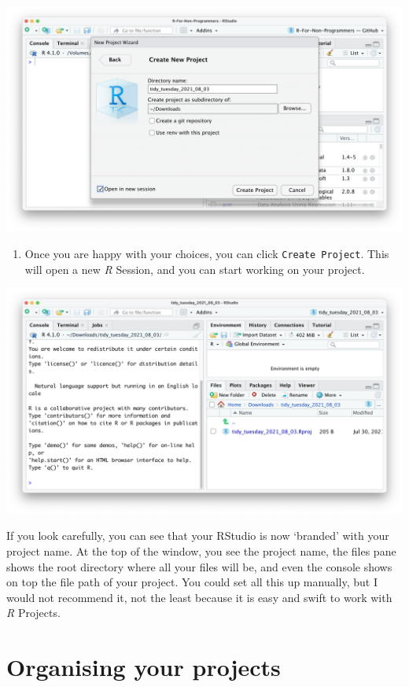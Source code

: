 \documentclass[
  letterpaper,
  DIV=11,
  numbers=noendperiod]{scrreprt}
\providecommand{\tightlist}{%
  \setlength{\itemsep}{0pt}\setlength{\parskip}{0pt}}\usepackage{longtable,booktabs,array}
\begin{document}
\includegraphics{images/chapter_06_img/00_r_project/04_r_project_directory_name.png}

\begin{enumerate}
\def\labelenumi{\arabic{enumi}.}
\setcounter{enumi}{6}
\tightlist
\item
  Once you are happy with your choices, you can click
  \texttt{Create\ Project}. This will open a new \emph{R} Session, and
  you can start working on your project.
\end{enumerate}

\includegraphics{images/chapter_06_img/00_r_project/05_r_project_new_session.png}

If you look carefully, you can see that your RStudio is now `branded'
with your project name. At the top of the window, you see the project
name, the files pane shows the root directory where all your files will
be, and even the console shows on top the file path of your project. You
could set all this up manually, but I would not recommend it, not the
least because it is easy and swift to work with \emph{R} Projects.

\section{Organising your projects}\label{sec-organising-your-projects}
\end{document}
